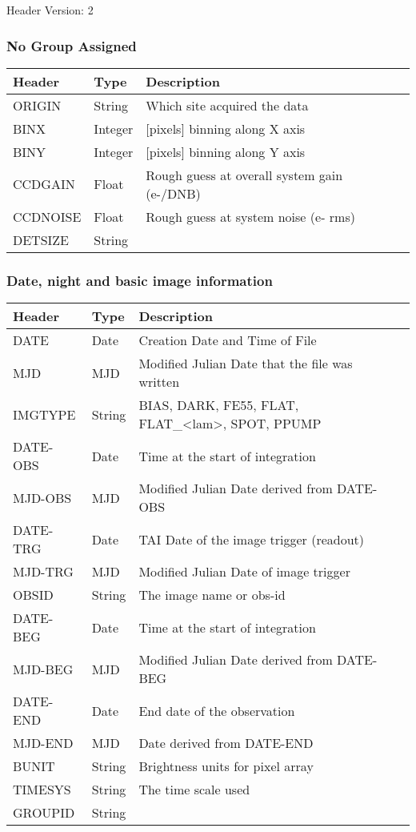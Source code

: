 Header Version: 2

\subsubsection{No Group Assigned}


\begin{tabular}{l l l l l}
\hline
Header & Type & Description \\
\hline
ORIGIN & String & Which site acquired the data \\
BINX & Integer & [pixels] binning along X axis \\
BINY & Integer & [pixels] binning along Y axis \\
CCDGAIN & Float & Rough guess at overall system gain (e-/DNB) \\
CCDNOISE & Float & Rough guess at system noise (e- rms) \\
DETSIZE & String &  \\
\hline
\end{tabular}


\subsubsection{Date, night and basic image information}


\begin{tabular}{l l l l l}
\hline
Header & Type & Description \\
\hline
DATE & Date & Creation Date and Time of File \\
MJD & MJD & Modified Julian Date that the file was written \\
IMGTYPE & String & BIAS, DARK, FE55, FLAT, FLAT\_<lam>, SPOT, PPUMP \\
DATE-OBS & Date & Time at the start of integration \\
MJD-OBS & MJD & Modified Julian Date derived from DATE-OBS \\
DATE-TRG & Date & TAI Date of the image trigger (readout) \\
MJD-TRG & MJD & Modified Julian Date of image trigger \\
OBSID & String & The image name or obs-id \\
DATE-BEG & Date & Time at the start of integration \\
MJD-BEG & MJD & Modified Julian Date derived from DATE-BEG \\
DATE-END & Date & End date of the observation \\
MJD-END & MJD & Date derived from DATE-END \\
BUNIT & String & Brightness units for pixel array \\
TIMESYS & String & The time scale used \\
GROUPID & String &  \\
\hline
\end{tabular}


